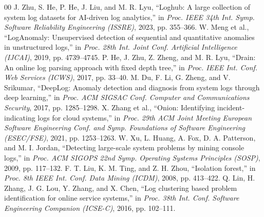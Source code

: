\documentclass[conference]{IEEEtran}
\begin{document}
\begin{thebibliography}{00}
 J. Zhu, S. He, P. He, J. Liu, and M. R. Lyu, ``Loghub: A large collection of system log datasets for AI-driven log analytics,'' in \textit{Proc. IEEE 34th Int. Symp. Software Reliability Engineering (ISSRE)}, 2023, pp. 355--366.
 W. Meng et al., ``LogAnomaly: Unsupervised detection of sequential and quantitative anomalies in unstructured logs,'' in \textit{Proc. 28th Int. Joint Conf. Artificial Intelligence (IJCAI)}, 2019, pp. 4739--4745.
 P. He, J. Zhu, Z. Zheng, and M. R. Lyu, ``Drain: An online log parsing approach with fixed depth tree,'' in \textit{Proc. IEEE Int. Conf. Web Services (ICWS)}, 2017, pp. 33--40.
 M. Du, F. Li, G. Zheng, and V. Srikumar, ``DeepLog: Anomaly detection and diagnosis from system logs through deep learning,'' in \textit{Proc. ACM SIGSAC Conf. Computer and Communications Security}, 2017, pp. 1285--1298.
 X. Zhang et al., ``Onion: Identifying incident-indicating logs for cloud systems,'' in \textit{Proc. 29th ACM Joint Meeting European Software Engineering Conf. and Symp. Foundations of Software Engineering (ESEC/FSE)}, 2021, pp. 1253--1263.
 W. Xu, L. Huang, A. Fox, D. A. Patterson, and M. I. Jordan, ``Detecting large-scale system problems by mining console logs,'' in \textit{Proc. ACM SIGOPS 22nd Symp. Operating Systems Principles (SOSP)}, 2009, pp. 117--132.
 F. T. Liu, K. M. Ting, and Z. H. Zhou, ``Isolation forest,'' in \textit{Proc. 8th IEEE Int. Conf. Data Mining (ICDM)}, 2008, pp. 413--422.
 Q. Lin, H. Zhang, J. G. Lou, Y. Zhang, and X. Chen, ``Log clustering based problem identification for online service systems,'' in \textit{Proc. 38th Int. Conf. Software Engineering Companion (ICSE-C)}, 2016, pp. 102--111.
\end{thebibliography}
\end{document}
